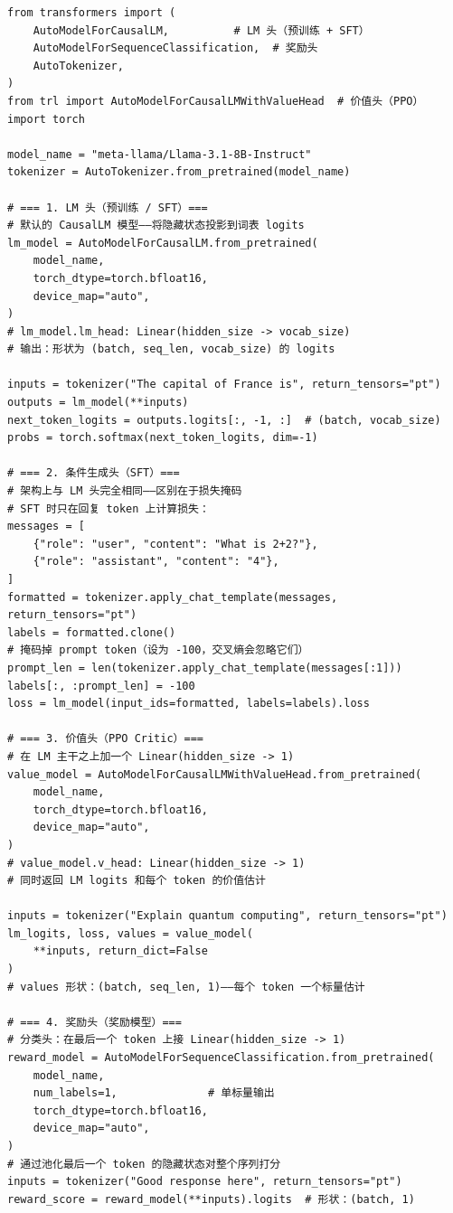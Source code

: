 \begin{lstlisting}[style=pythonstyle, caption={使用 HuggingFace 加载与使用不同的预测头。}]
from transformers import (
    AutoModelForCausalLM,          # LM 头（预训练 + SFT）
    AutoModelForSequenceClassification,  # 奖励头
    AutoTokenizer,
)
from trl import AutoModelForCausalLMWithValueHead  # 价值头（PPO）
import torch

model_name = "meta-llama/Llama-3.1-8B-Instruct"
tokenizer = AutoTokenizer.from_pretrained(model_name)

# === 1. LM 头（预训练 / SFT）===
# 默认的 CausalLM 模型——将隐藏状态投影到词表 logits
lm_model = AutoModelForCausalLM.from_pretrained(
    model_name,
    torch_dtype=torch.bfloat16,
    device_map="auto",
)
# lm_model.lm_head: Linear(hidden_size -> vocab_size)
# 输出：形状为 (batch, seq_len, vocab_size) 的 logits

inputs = tokenizer("The capital of France is", return_tensors="pt")
outputs = lm_model(**inputs)
next_token_logits = outputs.logits[:, -1, :]  # (batch, vocab_size)
probs = torch.softmax(next_token_logits, dim=-1)

# === 2. 条件生成头（SFT）===
# 架构上与 LM 头完全相同——区别在于损失掩码
# SFT 时只在回复 token 上计算损失：
messages = [
    {"role": "user", "content": "What is 2+2?"},
    {"role": "assistant", "content": "4"},
]
formatted = tokenizer.apply_chat_template(messages, return_tensors="pt")
labels = formatted.clone()
# 掩码掉 prompt token（设为 -100，交叉熵会忽略它们）
prompt_len = len(tokenizer.apply_chat_template(messages[:1]))
labels[:, :prompt_len] = -100
loss = lm_model(input_ids=formatted, labels=labels).loss

# === 3. 价值头（PPO Critic）===
# 在 LM 主干之上加一个 Linear(hidden_size -> 1)
value_model = AutoModelForCausalLMWithValueHead.from_pretrained(
    model_name,
    torch_dtype=torch.bfloat16,
    device_map="auto",
)
# value_model.v_head: Linear(hidden_size -> 1)
# 同时返回 LM logits 和每个 token 的价值估计

inputs = tokenizer("Explain quantum computing", return_tensors="pt")
lm_logits, loss, values = value_model(
    **inputs, return_dict=False
)
# values 形状：(batch, seq_len, 1)——每个 token 一个标量估计

# === 4. 奖励头（奖励模型）===
# 分类头：在最后一个 token 上接 Linear(hidden_size -> 1)
reward_model = AutoModelForSequenceClassification.from_pretrained(
    model_name,
    num_labels=1,              # 单标量输出
    torch_dtype=torch.bfloat16,
    device_map="auto",
)
# 通过池化最后一个 token 的隐藏状态对整个序列打分
inputs = tokenizer("Good response here", return_tensors="pt")
reward_score = reward_model(**inputs).logits  # 形状：(batch, 1)
\end{lstlisting}

